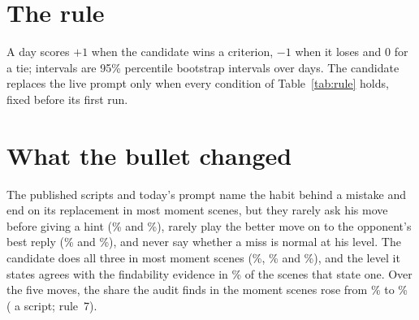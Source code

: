 \documentclass[11pt]{article}
\begin{document}
\section{The rule}

A day scores $+1$ when the candidate wins a criterion, $-1$ when it loses and $0$ for a tie;
intervals are 95\% percentile bootstrap intervals over days. The candidate replaces the live prompt
only when every condition of Table~\ref{tab:rule} holds, fixed before its first run.

\begin{table}[h]
\centering
\small\RuleTable
\caption{The rule, fixed before the candidate's first run. Coaching and overall are the judge's
scores per day; the claim rows and the coaching moves are the audit's numbers per script, candidate
minus today's prompt; the length is the candidate's script heard once over today's on the same day.}
\label{tab:rule}
\end{table}

\section{What the bullet changed}

\begin{table}[h]
\centering
\small\MovesTable
\caption{The coaching moves the audit finds, pooled over the \Cases{} days: the share of the scenes
that owe a move and make it, with the number owing it in brackets. A moment scene owes the habit,
its replacement and the level; it owes the open question only when it asks him something, and the
reply only when it shows a better move. In the middle rows, consecutive board scenes on the same
position count once, and a move counts as made when any of them makes it.}
\label{tab:moves}
\end{table}

The published scripts and today's prompt name the habit behind a mistake and end on its replacement
in most moment scenes, but they rarely ask his move before giving a hint (\PubOpenQuestion\% and
\BaseOpenQuestion\%), rarely play the better move on to the opponent's best reply (\PubThenWhat\%
and \BaseThenWhat\%), and never say whether a miss is normal at his level. The candidate does all
three in most moment scenes (\CandOpenQuestion\%, \CandThenWhat\% and \CandLevel\%), and the level
it states agrees with the findability evidence in \CandLevelTrue\% of the scenes that state one.
Over the five moves, the share the audit finds in the moment scenes rose from \ShareBase\% to
\ShareCand\% (\ShareDiff{} a script; rule~7).
\end{document}

